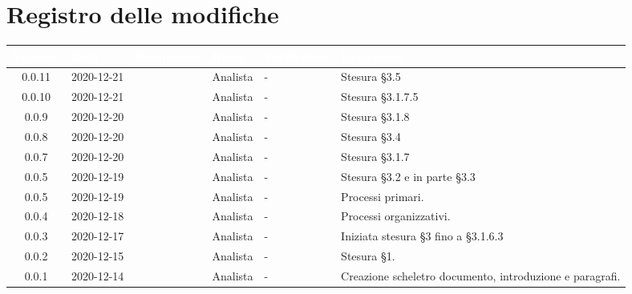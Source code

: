 \section*{Registro delle modifiche}
\setcounter{table}{-1}
{

\renewcommand{\arraystretch}{1.5}
\centering
\begin{longtable}{c C{2.6cm} C{2.6cm} C{2.6cm} C{2.6cm} C{3.5cm}}
\textcolor{white}{\textbf{Versione}}&
\textcolor{white}{\textbf{Data}}&
\textcolor{white}{\textbf{Nominativo}}&
\textcolor{white}{\textbf{Ruolo}}&
\textcolor{white}{\textbf{Verificatore}}&
\textcolor{white}{\textbf{Descrizione}}\\	
\endhead

0.0.11 & 2020-12-21 & \RA{} & Analista & - & Stesura \S 3.5 \\
0.0.10 & 2020-12-21 & \PA{} & Analista & - & Stesura \S 3.1.7.5 \\
0.0.9 & 2020-12-20 & \PA{} & Analista & - & Stesura \S 3.1.8 \\
0.0.8 & 2020-12-20 & \RA{} & Analista & - & Stesura \S 3.4 \\
0.0.7 & 2020-12-20 & \PA{} & Analista & - & Stesura \S 3.1.7 \\
0.0.5 & 2020-12-19 & \RA{} & Analista & - & Stesura \S 3.2 e in parte \S 3.3 \\
0.0.5 & 2020-12-19 & \ZM{} & Analista & - & Processi primari. \\
0.0.4 & 2020-12-18 & \SH{} & Analista & - & Processi organizzativi. \\
0.0.3 & 2020-12-17 & \PA{} & Analista & - & Iniziata stesura \S 3 fino a \S 3.1.6.3 \\
0.0.2 & 2020-12-15 & \PA{} & Analista & - & Stesura \S 1. \\
0.0.1 & 2020-12-14 & \ZM{} & Analista & - & Creazione scheletro documento, introduzione e paragrafi. \\
		
\end{longtable}
}
